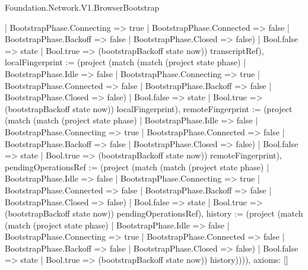 \begin{lexlean}{Foundation.Network.V1.BrowserBootstrap}
\begin{semanticmodule}
{{        | BootstrapPhase.Connecting => true
        | BootstrapPhase.Connected => false
        | BootstrapPhase.Backoff => false
        | BootstrapPhase.Closed => false)
      | Bool.false => state
      | Bool.true => (bootstrapBackoff state now)) transcriptRef), localFingerprint := (project (match (match (project state phase)
        | BootstrapPhase.Idle => false
        | BootstrapPhase.Connecting => true
        | BootstrapPhase.Connected => false
        | BootstrapPhase.Backoff => false
        | BootstrapPhase.Closed => false)
      | Bool.false => state
      | Bool.true => (bootstrapBackoff state now)) localFingerprint), remoteFingerprint := (project (match (match (project state phase)
        | BootstrapPhase.Idle => false
        | BootstrapPhase.Connecting => true
        | BootstrapPhase.Connected => false
        | BootstrapPhase.Backoff => false
        | BootstrapPhase.Closed => false)
      | Bool.false => state
      | Bool.true => (bootstrapBackoff state now)) remoteFingerprint), pendingOperationsRef := (project (match (match (project state phase)
        | BootstrapPhase.Idle => false
        | BootstrapPhase.Connecting => true
        | BootstrapPhase.Connected => false
        | BootstrapPhase.Backoff => false
        | BootstrapPhase.Closed => false)
      | Bool.false => state
      | Bool.true => (bootstrapBackoff state now)) pendingOperationsRef), history := (project (match (match (project state phase)
        | BootstrapPhase.Idle => false
        | BootstrapPhase.Connecting => true
        | BootstrapPhase.Connected => false
        | BootstrapPhase.Backoff => false
        | BootstrapPhase.Closed => false)
      | Bool.false => state
      | Bool.true => (bootstrapBackoff state now)) history)}))),
  axioms: []
}


\end{semanticmodule}
\end{lexlean}
